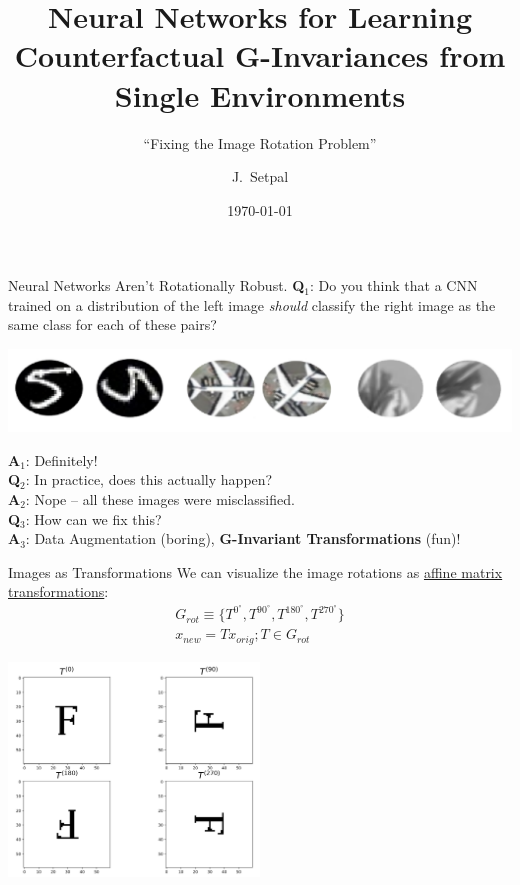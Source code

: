 \documentclass{beamer}
\title[G-Transformation Invaraiance]{Neural Networks for Learning Counterfactual G-Invariances from Single Environments}
\subtitle{``Fixing the Image Rotation Problem''}
\author[COM 314] %
{J.~Setpal}
\date{\today}
\begin{document}
\frame{\titlepage}

\begin{frame}{Neural Networks Aren't Rotationally Robust.}
	\textbf{Q}${}_1$: Do you think that a CNN trained on a distribution of the left image \textit{should} classify the right image as the same class for each of these pairs?
	\vspace{-.9em}
	\begin{center}
		\includegraphics[width=\textwidth]{img/rot.png}
	\end{center} 
	\pause
	\vspace{-1em}
	\textbf{A}${}_1$: Definitely! \pause \newline \\
	\textbf{Q}${}_2$: In practice, does this actually happen? \pause \\
	\textbf{A}${}_2$: Nope -- all these images were misclassified. \pause \newline \\
	\textbf{Q}${}_3$: How can we fix this? \pause \\
	\textbf{A}${}_3$: Data Augmentation (boring)\pause, \textbf{G-Invariant Transformations} (fun)!
\end{frame}

\begin{frame}{Images as Transformations}
	We can visualize the image rotations as \underline{affine matrix transformations}:
	\begin{gather}
		G_{rot} \equiv \{T^{0^\circ}, T^{90^\circ}, T^{180^\circ}, T^{270^\circ}\} \\
		x_{new} = T x_{orig}; T \in G_{rot}
	\end{gather}
	\vspace{-2em}
	\begin{center}
		\includegraphics[width=0.5\textwidth]{img/f_rots.png}
	\end{center}
\end{frame}
\end{document}
